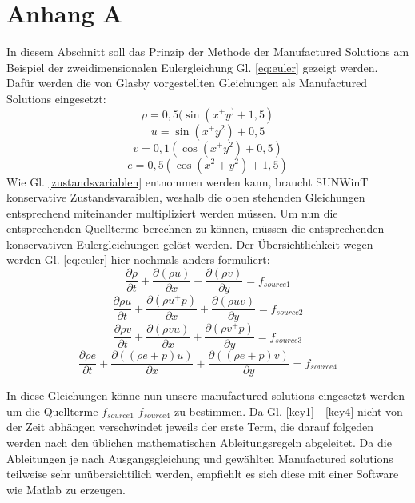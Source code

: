 \newpage
\chapter*{Anhang A}
In diesem Abschnitt soll das Prinzip der Methode der Manufactured Solutions am Beispiel der zweidimensionalen Eulergleichung Gl. \ref{eq:euler} gezeigt werden. Dafür werden die von Glasby \cite{glasby2013comparison} vorgestellten Gleichungen als Manufactured Solutions eingesetzt:
\begin{equation}\label{key1}
	\rho = 0,5 (\sin(x^+y^)+1,5)
\end{equation}
\begin{equation}\label{key2}
	u = \sin(x^+y^2)+0,5
\end{equation}
\begin{equation}\label{key3}
	v = 0,1(\cos(x^+y^2)+0,5)
\end{equation}
\begin{equation}\label{key4}
	e = 0,5(\cos(x^2+y^2)+1,5)
\end{equation}
Wie Gl. \ref{zustandsvariablen} entnommen werden kann, braucht SUNWinT konservative Zustandsvaraiblen, weshalb die oben stehenden Gleichungen entsprechend miteinander multipliziert werden müssen.
Um nun die entsprechenden Quellterme berechnen zu können, müssen die entsprechenden konservativen Eulergleichungen gelöst werden. Der Übersichtlichkeit wegen werden Gl. \ref{eq:euler} hier nochmals anders formuliert:
\begin{equation}\label{eq:firstSource}
	\frac{\partial \rho}{\partial t}+\frac{\partial(\rho u)}{\partial x} + \frac{\partial (\rho v)}{\partial y} = f_{source1}
\end{equation}
\begin{equation}\label{eq:secondSource}
	\frac{\partial \rho u}{\partial t}+\frac{\partial(\rho u^+p)}{\partial x} + \frac{\partial (\rho u v)}{\partial y} = f_{source2}
\end{equation}
\begin{equation}\label{eq:thirdSource}
\frac{\partial \rho v}{\partial t} + \frac{\partial (\rho v u)}{\partial x} + \frac{\partial(\rho v^+p)}{\partial y} = f_{source3}
\end{equation}
\begin{equation}\label{eq:fourthSource}
\frac{\partial \rho e}{\partial t} + \frac{\partial ((\rho e+p)u)}{\partial x} +\frac{\partial ((\rho e+p)v)}{\partial y} = f_{source4}
\end{equation}

In diese Gleichungen könne nun unsere manufactured solutions eingesetzt werden um die Quellterme $f_{source1}$-$f_{source4}$ zu bestimmen. Da Gl. \ref{key1} - \ref{key4} nicht von der Zeit abhängen verschwindet jeweils der erste Term, die darauf folgeden werden nach den üblichen mathematischen Ableitungsregeln abgeleitet. Da die Ableitungen je nach Ausgangsgleichung und gewählten Manufactured solutions teilweise sehr unübersichtilich werden, empfiehlt es sich diese mit einer Software wie Matlab zu erzeugen. 